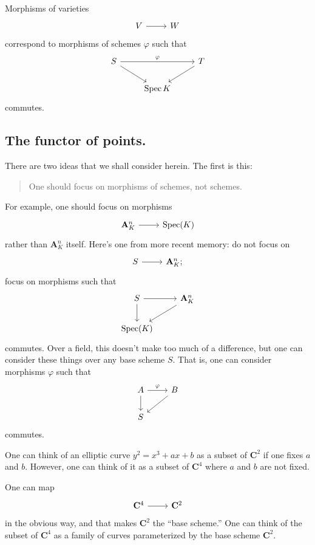\documentclass [11 pt, oneside] {article}
\begin{document}
\begin{remark}
	Morphisms of varieties
	\[
\begin{tikzcd}
V\ar[r]&W
\end{tikzcd}
\] 
correspond to morphisms of schemes $\varphi$ such that
	\[
	\begin{tikzcd}
		S\ar[rr,"\varphi"] \ar[dr] && T\ar[ld] \\
					   &\Spec K
	\end{tikzcd}
	\]
	commutes.	
\end{remark}

\subsection{The functor of points.}
There are two ideas that we shall consider herein. The first is this:
\begin{quote}
	\small 
	One should focus on morphisms of schemes, not schemes.
\end{quote}
For example, one should focus on morphisms
\[
\begin{tikzcd}
\mathbf{A}^n_K\ar[r]& \Spec(K)
\end{tikzcd}
\] 
rather than $\mathbf{A}^n_K$ itself. Here's one from more recent memory: do not focus on
\[
\begin{tikzcd}
S\ar[r]& \mathbf{A}^n_K;
\end{tikzcd}
\] 
focus on morphisms such that
\[
\begin{tikzcd}
	S\ar[d] \ar[r] &\mathbf{A}^n_K\ar[dl]\\
	\Spec (K)
\end{tikzcd}
\]
commutes. Over a field, this doesn't make too much of a difference, but one can consider these things over any base scheme $S$. That is, one can consider morphisms $\varphi$ such that
\[
\begin{tikzcd}
	 A\ar[r,"\varphi"]\ar[d]&B\ar[dl]\\
        S
\end{tikzcd}
\]
commutes.

\begin{example}[ ]\label{}\text{}
One can think of an elliptic curve $y^2 = x^3+ax+b$ as a subset of $\mathbf{C}^2$ if one fixes $a$ and $b$. However, one can think of it as a subset of $\mathbf{C}^4$ where $a$ and $b$ are not fixed.

One can map 
\[
\begin{tikzcd}
\mathbf{C}^4\ar[r]& \mathbf{C}^2
\end{tikzcd}
\] 
in the obvious way, and that makes $\mathbf{C}^2$ the ``base scheme.'' One can think of the subset of $\mathbf{C}^4$ as a family of curves parameterized by the base scheme $\mathbf{C}^2$.
\end{example}
\end{document}

